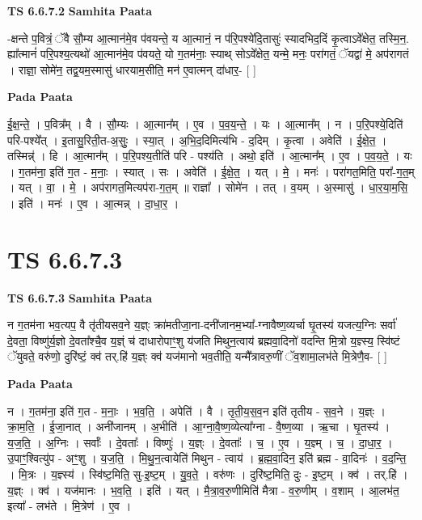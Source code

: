 \documentclass[17pt]{extarticle}
\begin{document}
\textbf{TS 6.6.7.2 } \newline
\textbf{Samhita Paata} \newline

-क्षन्ते प॒वित्रं॒ ॅवै सौ॒म्य आ॒त्मान॑मे॒व प॑वयन्ते॒ य आ॒त्मानं॒ न प॑रि॒पश्ये॑दि॒तासुः॑ स्यादभिद॒दिं कृ॒त्वाऽवे᳚क्षेत॒ तस्मि॒न॒. ह्या᳚त्मानं॑ परि॒पश्य॒त्यथो॑ आ॒त्मान॑मे॒व प॑वयते॒ यो ग॒तम॑नाः॒ स्याथ् सोऽवे᳚क्षेत॒ यन्मे॒ मनः॒ परा॑गतं॒ ॅयद्वा॑ मे॒ अप॑रागतं । राज्ञा॒ सोमे॑न॒ तद्व॒यम॒स्मासु॑ धारयाम॒सीति॒ मन॑ ए॒वात्मन् दा॑धार॒- [  ] \newline

\textbf{Pada Paata} \newline

ई॒क्ष॒न्ते॒ । प॒वित्र᳚म् । वै । सौ॒म्यः । आ॒त्मान᳚म् । ए॒व । प॒व॒य॒न्ते॒ । यः । आ॒त्मान᳚म् । न । प॒रि॒पश्ये॒दिति॑ परि-पश्ये᳚त् । इ॒तासु॒रिती॒त-अ॒सुः॒ । स्या॒त् । अ॒भि॒द॒दिमित्य॑भि - द॒दिम् । कृ॒त्वा । अवेति॑ । ई॒क्षे॒त॒ । तस्मिन्न्॑ । हि । आ॒त्मान᳚म् । प॒रि॒पश्य॒तीति॑ परि - पश्य॑ति । अथो॒ इति॑ । आ॒त्मान᳚म् । ए॒व । प॒व॒य॒ते॒ । यः । ग॒तम॑ना॒ इति॑ ग॒त - म॒नाः॒ । स्यात् । सः । अवेति॑ । ई॒क्षे॒त॒ । यत् । मे॒ । मनः॑ । परा॑गत॒मिति॒ परा᳚-ग॒त॒म् । यत् । वा॒ । मे॒ । अप॑रागत॒मित्यप॑रा-ग॒त॒म् ॥ राज्ञा᳚ । सोमे॑न । तत् । व॒यम् । अ॒स्मासु॑ । धा॒र॒या॒म॒सि॒ । इति॑ । मनः॑ । ए॒व । आ॒त्मन्न् । दा॒धा॒र॒ ।  \newline




\section*{ TS 6.6.7.3 }

\textbf{TS 6.6.7.3 } \newline
\textbf{Samhita Paata} \newline

न ग॒तम॑ना भव॒त्यप॒ वै तृ॑तीयसव॒ने य॒ज्ञ्ः क्रा॑मतीजा॒ना-दनी॑जानम॒भ्या᳚-ग्नावैष्ण॒व्यर्चा घृ॒तस्य॑ यजत्य॒ग्निः सर्वा॑ दे॒वता॒ विष्णु॑र्य॒ज्ञो दे॒वता᳚श्चै॒व य॒ज्ञ्ं च॑ दाधारोपाꣳ॒॒शु य॑जति मिथुन॒त्वाय॑ ब्रह्मवा॒दिनो॑ वदन्ति मि॒त्रो य॒ज्ञ्स्य॒ स्वि॑ष्टं ॅयुवते॒ वरु॑णो॒ दुरि॑ष्टं॒ क्व॑ तर्.हि॑ य॒ज्ञ्ः क्व॑ यज॑मानो भव॒तीति॒ यन्मै᳚त्रावरु॒णीं ॅव॒शामा॒लभ॑ते मि॒त्रेणै॒व- [  ] \newline

\textbf{Pada Paata} \newline

न । ग॒तम॑ना॒ इति॑ ग॒त - म॒नाः॒ । भ॒व॒ति॒ । अपेति॑ । वै । तृ॒ती॒य॒स॒व॒न इति॑ तृतीय - स॒व॒ने । य॒ज्ञ्ः । क्रा॒म॒ति॒ । ई॒जा॒नात् । अनी॑जानम् । अ॒भीति॑ । आ॒ग्ना॒वै॒ष्ण॒व्येत्या᳚ग्ना - वै॒ष्ण॒व्या । ऋ॒चा । घृ॒तस्य॑ । य॒ज॒ति॒ । अ॒ग्निः । सर्वाः᳚ । दे॒वताः᳚ । विष्णुः॑ । य॒ज्ञ्ः । दे॒वताः᳚ । च॒ । ए॒व । य॒ज्ञ्म् । च॒ । दा॒धा॒र॒ । उ॒पाꣳ॒॒श्वित्यु॑प - अꣳ॒॒शु । य॒ज॒ति॒ । मि॒थु॒न॒त्वायेति॑ मिथुन - त्वाय॑ । ब्र॒ह्म॒वा॒दिन॒ इति॑ ब्रह्म - वा॒दिनः॑ । व॒द॒न्ति॒ । मि॒त्रः । य॒ज्ञ्स्य॑ । स्वि॑ष्ट॒मिति॒ सु-इ॒ष्ट॒म् । यु॒व॒ते॒ । वरु॑णः । दुरि॑ष्ट॒मिति॒ दुः - इ॒ष्ट॒म् । क्व॑ । तर्.हि॑ । य॒ज्ञ्ः । क्व॑ । यज॑मानः । भ॒व॒ति॒ । इति॑ । यत् । मै॒त्रा॒व॒रु॒णीमिति॑ मैत्रा - व॒रु॒णीम् । व॒शाम् । आ॒लभ॑त॒ इत्या᳚ - लभ॑ते । मि॒त्रेण॑ । ए॒व ।  \newline
\end{document}
